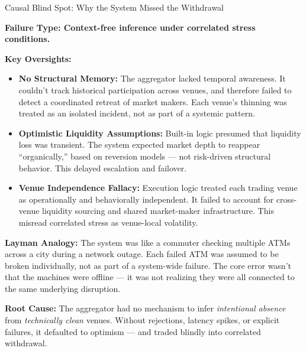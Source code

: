 \begin{TechnicalSidebar}{Causal Blind Spot: Why the System Missed the Withdrawal}

  \textbf{Failure Type: Context-free inference under correlated stress conditions.}
  
  \vspace{0.5em}
  
  \textbf{Key Oversights:}
  
  \begin{itemize}
    \item \textbf{No Structural Memory:}  
    The aggregator lacked temporal awareness. It couldn’t track historical participation across venues, and therefore failed to detect a coordinated retreat of market makers. Each venue’s thinning was treated as an isolated incident, not as part of a systemic pattern.
  
    \item \textbf{Optimistic Liquidity Assumptions:}  
    Built-in logic presumed that liquidity loss was transient. The system expected market depth to reappear “organically,” based on reversion models — not risk-driven structural behavior. This delayed escalation and failover.
  
    \item \textbf{Venue Independence Fallacy:}  
    Execution logic treated each trading venue as operationally and behaviorally independent. It failed to account for cross-venue liquidity sourcing and shared market-maker infrastructure. This misread correlated stress as venue-local volatility.
  \end{itemize}
  
  \vspace{0.5em}
  
  \textbf{Layman Analogy:}  
  The system was like a commuter checking multiple ATMs across a city during a network outage. Each failed ATM was assumed to be broken individually, not as part of a system-wide failure. The core error wasn’t that the machines were offline — it was not realizing they were all connected to the same underlying disruption.
  
  \vspace{0.5em}
  
  \textbf{Root Cause:}  
  The aggregator had no mechanism to infer \emph{intentional absence} from \emph{technically clean} venues. Without rejections, latency spikes, or explicit failures, it defaulted to optimism — and traded blindly into correlated withdrawal.
  
\end{TechnicalSidebar}


